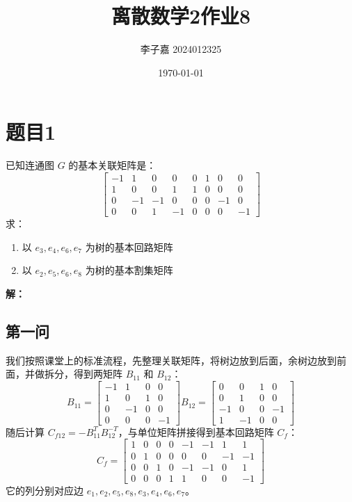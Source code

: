 \documentclass[utf8]{ctexart}
\title{\textbf{离散数学2\quad 作业8}}
\date{\today}
\author{李子嘉 2024012325}
\theoremstyle{mystyle}
\begin{document}
\maketitle

\section*{题目1}

\begin{problembox}
    已知连通图 $G$ 的基本关联矩阵是：
\[
\begin{bmatrix}-1 & 1 & 0 & 0 & 0 & 1 & 0 & 0 \\ 1 & 0 & 0 & 1 & 1 & 0 & 0 & 0 \\ 0 & -1 & -1 & 0 & 0 & 0 & -1 & 0 \\ 0 & 0 & 1 & -1 & 0 & 0 & 0 & -1\end{bmatrix}
\]
求：
\begin{enumerate}
    \item 以 ${e_3, e_4, e_6, e_7}$ 为树的基本回路矩阵
    \item 以 ${e_2, e_5, e_6, e_8}$ 为树的基本割集矩阵
\end{enumerate}
\end{problembox}
\textbf{解：} 
\subsection*{第一问}
我们按照课堂上的标准流程，先整理关联矩阵，将树边放到后面，余树边放到前面，并做拆分，得到两矩阵 $B_{11}$ 和 $B_{12}$：
\[
B_{11} = \begin{bmatrix}-1 & 1 & 0 & 0 \\ 1 & 0 & 1 & 0 \\ 0 & -1 & 0 & 0 \\ 0 & 0 & 0 & -1\end{bmatrix}
B_{12} = \begin{bmatrix}0 & 0 & 1 & 0 \\ 0 & 1 & 0 & 0 \\ -1 & 0 & 0 & -1 \\ 1 & -1 & 0 & 0\end{bmatrix}
\]
随后计算 $C_{f12} = -B_{11}^{T}B_{12}^{-T}$，与单位矩阵拼接得到基本回路矩阵 $C_f$：
\[
C_f = \begin{bmatrix}1 & 0 & 0 & 0 & -1 & -1 & 1 & 1 \\ 0 & 1 & 0 & 0 & 0 & 0 & -1 & -1 \\ 0 & 0 & 1 & 0 & -1 & -1 & 0 & 1 \\ 0 & 0 & 0 & 1 & 1 & 0 & 0 & -1\end{bmatrix}
\]
它的列分别对应边 $e_1, e_2, e_5, e_8, e_3, e_4, e_6, e_7$。
\end{document}
